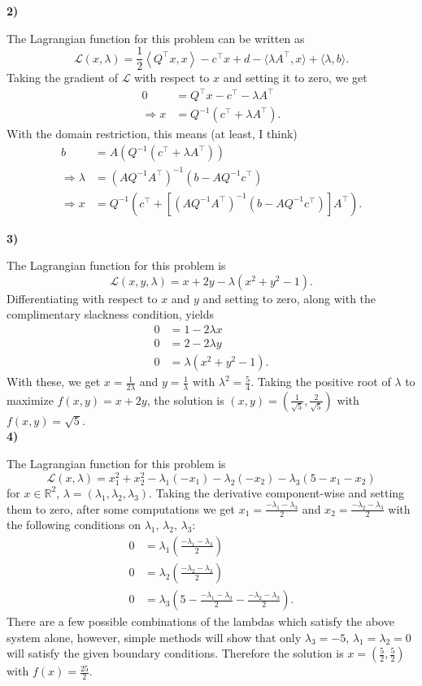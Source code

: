 \documentclass[12]{article}
\newcommand{\Lagr}{\mathscr{L}}
\begin{document}
\noindent
\textbf{2)}
	
	The Lagrangian function for this problem can be written as 
	$$\displaystyle
	\Lagr (x,\lambda)=\frac{1}{2}\left\langle Q^\top x,x\right\rangle -c^\top x+d-\langle \lambda A^\top,x \rangle+\langle \lambda,b \rangle.
	$$
Taking the gradient of $\Lagr$ with respect to $x$ and setting it to zero, we get
\begin{align*}
0&=Q^\top x - c^\top-\lambda A^\top \\
\Rightarrow x&=Q^{-1} (c^\top +\lambda A^\top).
\end{align*}
With the domain restriction, this means (at least, I think) 
\begin{align*}
b&=A(Q^{-1} (c^\top +\lambda A^\top)) \\
\Rightarrow \lambda &= (AQ^{-1}A^\top)^{-1}(b-AQ^{-1}c^\top) \\
\Rightarrow x &= Q^{-1} (c^\top +[(AQ^{-1}A^\top)^{-1}(b-AQ^{-1}c^\top)] A^\top).
\end{align*}
\pagebreak

\noindent
\textbf{3)}

	The Lagrangian function for this problem is 
	$$\displaystyle
	\Lagr (x,y,\lambda)=x+2y-\lambda (x^2+y^2-1).
	$$
Differentiating with respect to $x$ and $y$ and setting to zero, along with the complimentary slackness condition, yields
\begin{align*}
0&=1-2\lambda x \\
0&=2-2\lambda y \\
0&=\lambda (x^2+y^2-1).
\end{align*}
With these, we get $\displaystyle x=\frac{1}{2\lambda}$ and $\displaystyle y=\frac{1}{\lambda}$ with $\displaystyle \lambda^2=\frac{5}{4}$. Taking the positive root of $\lambda$ to maximize $f(x,y)=x+2y$, the solution is $\displaystyle (x,y)=\left(\frac{1}{\sqrt{5}},\frac{2}{\sqrt{5}}\right)$ with $f(x,y)=\sqrt{5}$.\\

\noindent
\textbf{4)}
	
	The Lagrangian function for this problem is 
	$$\displaystyle 
	\Lagr (x,\lambda)=x_1^2+x_2^2-\lambda_1 (-x_1) -\lambda_2 (-x_2) -\lambda_3 (5-x_1-x_2)
	$$
for $x\in \mathbb{R}^2,\, \lambda=(\lambda_1,\lambda_2,\lambda_3)$. Taking the derivative component-wise and setting them to zero, after some computations we get $\displaystyle x_1=\frac{-\lambda_1 -\lambda_3}{2}$ and $\displaystyle x_2=\frac{-\lambda_2 -\lambda_3}{2}$ with the following conditions on $\lambda_1 ,\, \lambda_2 ,\, \lambda_3$:
\begin{align*}
0&=\lambda_1 \left(\frac{-\lambda_1 -\lambda_3}{2}\right) \\
0&=\lambda_2 \left(\frac{-\lambda_2 -\lambda_3}{2}\right) \\
0&=\lambda_3 \left(5-\frac{-\lambda_1 -\lambda_3}{2}-\frac{-\lambda_2 -\lambda_3}{2}\right).
\end{align*}
There are a few possible combinations of the lambdas which satisfy the above system alone, however, simple methods will show that only $\lambda_3=-5,\,\lambda_1=\lambda_2=0$ will satisfy the given boundary conditions. Therefore the solution is $\displaystyle x=\left(\frac{5}{2},\frac{5}{2}\right)$ with $\displaystyle f(x)=\frac{25}{2}$.
\end{document}
